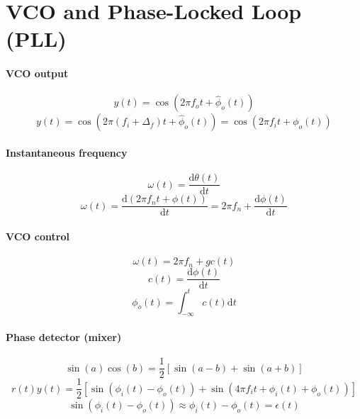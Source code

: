 \section*{VCO and Phase-Locked Loop (PLL)}

\paragraph{VCO output}
\begin{equation}
y(t)=\cos(2 \pi f_o t + \hat \phi_o(t))
\label{eq:vcoOutput}
\end{equation}
\begin{equation}
y(t)=\cos(2 \pi (f_i + \Delta_f) t + \hat \phi_o(t)) = \cos(2 \pi f_i t +  \phi_o(t))
\label{eq:vcoTrick}
\end{equation}

\paragraph{Instantaneous frequency}
\begin{equation}
\omega(t) = \frac{\textrm{d} \theta(t)}{\textrm{d} t}
\label{eq:instantaneousFrequency}
\end{equation}
\begin{equation}
\omega(t) = \frac{\textrm{d} (2 \pi f_n t + \phi(t)) }{\textrm{d} t} = 2 \pi f_n + \frac{\textrm{d} \phi(t) }{\textrm{d} t}
\label{eq:vcoOmega}
\end{equation}

\paragraph{VCO control}
\begin{equation}
\omega(t) = 2 \pi f_n + g c(t)
\label{eq:vco1}
\end{equation}
\begin{equation}
c(t) = \frac{\textrm{d} \phi(t) }{\textrm{d} t}
\label{eq:vcoControl}
\end{equation}
\begin{equation}
\phi_o(t) = \int_{-\infty}^t c(t) \textrm{d}t
\label{eq:vcoIntegral}
\end{equation}

\paragraph{Phase detector (mixer)}
\[
\sin(a) \cos(b) = \frac{1}{2}[\sin(a-b) + \sin(a+b)]
\]
\begin{equation}
r(t) y(t) = \frac{1}{2}[\sin(\phi_i(t) - \phi_o(t)) +  \sin(4 \pi f_i t + \phi_i(t) + \phi_o(t))]
\label{eq:mixerOutput}
\end{equation}
\[
\sin(\phi_i(t) - \phi_o(t)) \approx \phi_i(t) - \phi_o(t) = \epsilon(t)
\]

